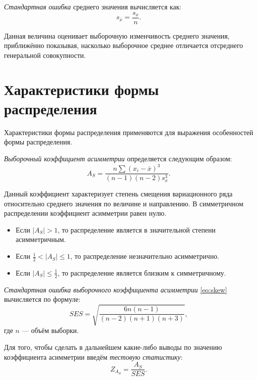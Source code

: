 \textit{Стандартная ошибка} среднего значения вычисляется как:
\begin{equation*}
	s_{\overline{x}} = \frac{s_x}{n}.
\end{equation*}

Данная величина оценивает выборочную изменчивость среднего значения, приближённо показывая, насколько выборочное среднее отличается отсреднего генеральной совокупности.


\section*{Характеристики формы распределения} %
\label{sec:chars_distr}

Характеристики формы распределения применяются для выражения особенностей формы распределения.

\textit{Выборочный коэффициент асимметрии} определяется следующим образом:
\begin{equation}
\label{eq:skew}
	A_S = \frac{n\sum{(x_i - \overline{x})^3}}{(n - 1)(n - 2)s_x^3}.
\end{equation}

Данный коэффициент характеризует степень смещения вариационного ряда относительно среднего значения по величине и направлению. В симметричном распределении коэффициент асимметрии равен нулю. 
\begin{itemize}
	\item Если $\vert A_S \vert > 1$, то распределение является в значительной степени асимметричным. 
	\item Если $\frac{1}{2} < \vert A_S \vert \le 1$, то распределение незначительно асимметрично. 
	\item Если $\vert A_S \vert \le \frac{1}{2}$, то распределение является близким к симметричному.
\end{itemize}

\textit{Стандартная ошибка выборочного коэффициента асимметрии} \eqref{eq:skew} вычисляется по формуле:
\begin{equation*}
	SES= \sqrt{\frac{6n(n - 1)}{(n - 2)(n + 1)(n + 3)}},
\end{equation*}
где $n$ --- объём выборки.

Для того, чтобы сделать в дальнейшем какие-либо выводы по значению коэффициента асимметрии введём \textit{тестовую статистику}: 
\begin{equation*}
	Z_{A_S}=\frac{A_S}{SES}.
\end{equation*}

